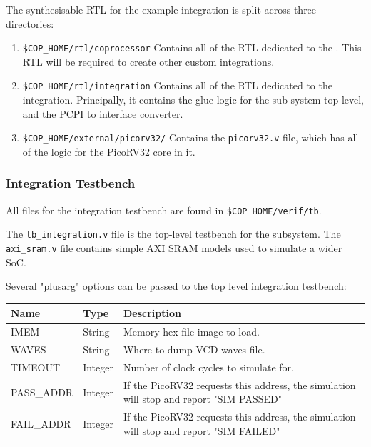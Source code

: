 The synthesisable RTL for the example integration is split across three
directories:

\begin{enumerate}
\item {\tt \$COP\_HOME/rtl/coprocessor} Contains all of the RTL dedicated
    to the \COP.
    This RTL will be required to create other custom integrations.
\item {\tt \$COP\_HOME/rtl/integration} Contains all of the RTL dedicated
    to the integration.
    Principally, it contains the glue logic for the
    sub-system top level, and the PCPI to \COP interface converter.
\item {\tt \$COP\_HOME/external/picorv32/} Contains the {\tt picorv32.v}
    file, which has all of the logic for the PicoRV32 core in it.
\end{enumerate}

\subsubsection{Integration Testbench}

All files for the integration testbench are found in 
{\tt \$COP\_HOME/verif/tb}.

The {\tt tb\_integration.v} file is the top-level testbench for the 
subsystem.
The {\tt axi\_sram.v} file contains simple AXI SRAM models used to simulate
a wider SoC.

Several "plusarg" options can be passed to the top level integration
testbench:

\begin{table}[h]
\begin{tabularx}{\textwidth}{l l Y}
\toprule
\textbf{Name} & \textbf{Type} & \textbf{Description} \\ \midrule
  IMEM        & String        & Memory hex file image to load. \\
  WAVES       & String        & Where to dump VCD waves file.  \\
  TIMEOUT     & Integer       & Number of clock cycles to simulate for. \\
  PASS\_ADDR  & Integer       & If the PicoRV32 requests this address, the 
    simulation will stop and report "SIM PASSED"    \\
  FAIL\_ADDR  & Integer       & If the PicoRV32 requests this address, the
    simulation will stop and report "SIM FAILED" \\
\bottomrule
\end{tabularx}
\end{table}

